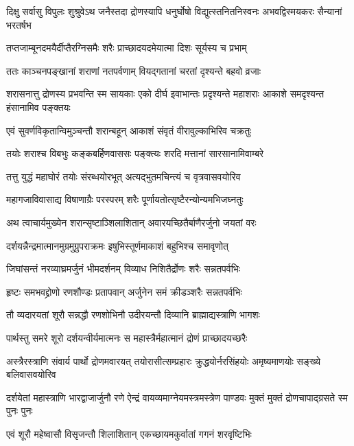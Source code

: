 \threelineshloka
{दिक्षु सर्वासु विपुलः शुश्रुवेऽथ जनैस्तदा}
{द्रोणस्यापि धनुर्घोषो विद्युत्स्तनितनिस्वनः}
{अभवद्विस्मयकरः सैन्यानां भरतर्षभ}


\twolineshloka
{तप्तजाम्बूनदमयैर्दीप्तैरग्निसमैः शरैः}
{प्राच्छादयदमेयात्मा दिशः सूर्यस्य च प्रभाम्}


\twolineshloka
{ततः काञ्चनपङ्खानां शराणां नतपर्वणाम्}
{वियद्गतानां चरतां दृश्यन्ते बहवो व्रजाः}


\threelineshloka
{शरासनात्तु द्रोणस्य प्रभवन्ति स्म सायकाः}
{एको दीर्घ इवाभान्तः प्रदृश्यन्ते महाशराः}
{आकाशे समदृश्यन्त हंसानामिव पङ्क्तयः}


\twolineshloka
{एवं सुवर्णविकृतान्विमुञ्चन्तौ शरान्बहून्}
{आकाशं संवृतं वीरावुल्काभिरिव चक्रतुः}


\twolineshloka
{तयोः शराश्च विबभुः कङ्कबर्हिणवाससः}
{पङ्क्त्यः शरदि मत्तानां सारसानामिवाम्बरे}


\twolineshloka
{तत्तु युद्धं महाघोरं तयोः संरब्धयोरभूत्}
{अत्यद्भुतमचिन्त्यं च वृत्रवासवयोरिव}


\twolineshloka
{महागजाविवासाद्य विषाणाग्रैः परस्परम्}
{शरैः पूर्णायतोत्सृष्टैरन्योन्यमभिजघ्नतुः}


\twolineshloka
{अथ त्वाचार्यमुख्येन शरान्सृष्टाञ्शिलाशितान्}
{अवारयच्छितैर्बाणैरर्जुनो जयतां वरः}


\twolineshloka
{दर्शयन्नैन्द्रमात्मानमुग्रमुग्रुपराक्रमः}
{इषुभिस्तूर्णमाकाशं बहुभिश्च समावृणोत्}



\twolineshloka
{जिघांसन्तं नरव्याघ्रमर्जुनं भीमदर्शनम्}
{विव्याध निशितैर्द्रोणः शरैः सन्नतपर्वभिः}


\twolineshloka
{हृष्टः समभवद्द्रोणो रणशौण्डः प्रतापवान्}
{अर्जुनेन समं क्रीडञ्शरैः सन्नतपर्वभिः}


\twolineshloka
{तौ व्यदारयतां शूरौ सन्नद्धौ रणशोभिनौ}
{उदीरयन्तौ दिव्यानि ब्राह्माद्यस्त्राणि भागशः}


\twolineshloka
{पार्थस्तु समरे शूरो दर्शयन्वीर्यमात्मनः}
{स महास्त्रैर्महात्मानं द्रोणं प्राच्छादयच्छरैः}


\onelineshloka
{अस्त्रैरस्त्राणि संवार्य पार्थो द्रोणमवारयत्}
\twolineshloka
{तयोरासीत्सम्प्रहारः क्रुद्धयोर्नरसिंहयोः}
{अमृष्यमाणयोः सङ्ख्ये बलिवासवयोरिव}


\onelineshloka
{दर्शयेतां महास्त्राणि भारद्वाजार्जुनौ रणे}
\twolineshloka
{ऐन्द्रं वायव्यमाग्नेयमस्त्रमस्त्रेण पाण्डवः}
{मुक्तं मुक्तं द्रोणचापाद्ग्रसते स्म पुनः पुनः}


\twolineshloka
{एवं शूरौ महेष्वासौ विसृजन्तौ शिलाशितान्}
{एकच्छायमकुर्वातां गगनं शरवृष्टिभिः}


